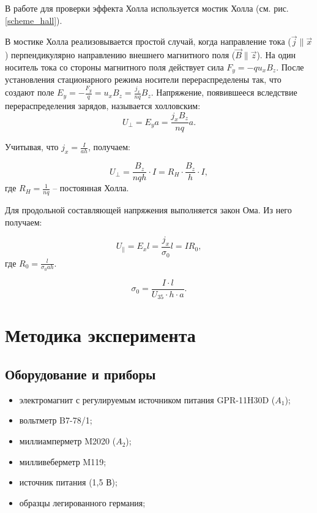 \documentclass[12pt,a4paper]{article}
\newcommand{\figref}[1]{(см. рис. \ref{#1})}
\begin{document}
	В работе для проверки эффекта Холла используется мостик Холла \figref{scheme_hall}.
	
	В мостике Холла реализовывается простой случай, когда направление тока ($\vec{j} \parallel \vec{x}$) перпендикулярно направлению внешнего магнитного поля ($\vec{B} \parallel \vec{z}$). На один носитель тока со стороны магнитного поля действует сила $F_y = - q u_x B_z$. После установления стационарного режима носители перераспределены так, что создают поле $E_y = - \frac{F_y}{q} = u_x B_z = \frac{j_x}{nq} B_z$. Напряжение, появившееся вследствие перераспределения зарядов, называется холловским:
	$$ U_\perp = E_y a = \frac{j_x B_z}{n q} a. $$
	
	Учитывая, что $j_x = \frac{I}{ah}$, получаем:
	
	\begin{equation}
		\label{U_perp}
		U_\perp = \frac{B_z}{nqh} \cdot I = R_H \cdot \frac{B_z}{h} \cdot I,
	\end{equation}
	где $R_H = \frac{1}{nq}$ -- постоянная Холла.
	
	Для продольной составляющей напряжения выполняется закон Ома. Из него получаем:
	
	$$ U_\parallel = E_x l = \frac{j_x}{\sigma_0} l = I R_0, $$
	где $R_0 = \frac{l}{\sigma_0 a h}$.
	
	\begin{equation}
		\label{sigma_0}
		\sigma_0 = \frac{I \cdot l}{U_{35} \cdot h \cdot a}.
	\end{equation}
	
	
	\section*{Методика эксперимента}
	
	\subsection*{Оборудование и приборы}
	\begin{itemize}[itemsep = 0pt, parsep=0pt]
		\item электромагнит с регулируемым источником пи­тания GPR-11H30D ($A_1$);
		\item вольтметр B7-78/1;
		\item миллиамперметр M2020 ($A_2$);
		\item милливеберметр M119;
		\item источник питания (1,5 В);
		\item образцы легированного германия;
	\end{itemize}
	
\end{document}
